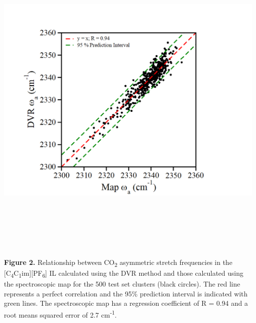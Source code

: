 \documentclass[]{article}
\begin{document}
\includegraphics[width=6.22356in,height=6.29517in]{figure2.png}

\textbf{Figure 2.} Relationship between CO\textsubscript{2} asymmetric
stretch frequencies in the
{[}C\textsubscript{4}C\textsubscript{1}im{]}{[}PF\textsubscript{6}{]} IL
calculated using the DVR method and those calculated using the
spectroscopic map for the 500 test set clusters (black circles). The red
line represents a perfect correlation and the 95\% prediction interval
is indicated with green lines. The spectroscopic map has a regression
coefficient of R = 0.94 and a root means squared error of 2.7
cm\textsuperscript{-1}.
\end{document}
